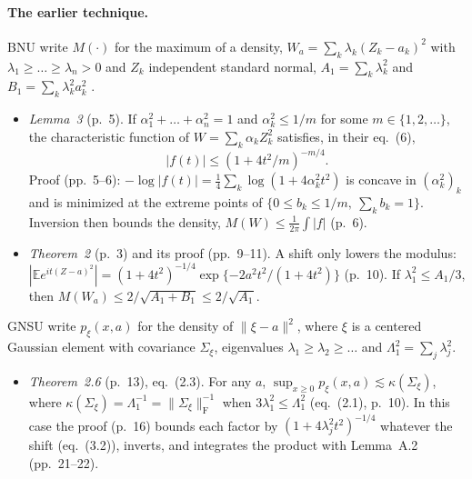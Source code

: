 \documentclass[11pt]{article}
\newcommand{\E}{\mathbb{E}}
\newcommand{\norm}[1]{\lVert #1\rVert}
\newcommand{\sloc}[2]{\cite[#2]{#1}}
\begin{document}
\paragraph{The earlier technique.}
BNU write $M(\cdot)$ for the maximum of a density, $W_a=\sum_k\lambda_k(Z_k-a_k)^2$
with $\lambda_1\ge\dots\ge\lambda_n>0$ and $Z_k$ independent standard normal,
$A_1=\sum_k\lambda_k^2$ and $B_1=\sum_k\lambda_k^2a_k^2$
\sloc{BobkovNaumovUlyanov2020-DensityMaxWeightedChiSquare}{\S2, p.~3}.
\begin{itemize}
\item \emph{Lemma~3} (p.~5). If $\alpha_1^2+\dots+\alpha_n^2=1$ and
 $\alpha_k^2\le1/m$ for some $m\in\{1,2,\dots\}$, the characteristic function
 of $W=\sum_k\alpha_kZ_k^2$ satisfies, in their eq.~(6),
 \[
  |f(t)|\le(1+4t^2/m)^{-m/4}.
 \]
 Proof (pp.~5--6): $-\log|f(t)|=\frac14\sum_k\log(1+4\alpha_k^2t^2)$ is concave in
 $(\alpha_k^2)_k$ and is minimized at the extreme points of
 $\{0\le b_k\le1/m,\ \sum_kb_k=1\}$. Inversion then bounds the density,
 $M(W)\le\frac1{2\pi}\int|f|$ (p.~6).
\item \emph{Theorem~2} (p.~3) and its proof (pp.~9--11). A shift only lowers
 the modulus: $|\E e^{it(Z-a)^2}|=(1+4t^2)^{-1/4}\exp\{-2a^2t^2/(1+4t^2)\}$
 (p.~10). If $\lambda_1^2\le A_1/3$, then
 $M(W_a)\le2/\sqrt{A_1+B_1}\le2/\sqrt{A_1}$.
\end{itemize}
GNSU write $p_\xi(x,a)$ for the density of $\norm{\xi-a}^2$, where $\xi$ is a
centered Gaussian element with covariance $\Sigma_\xi$, eigenvalues
$\lambda_1\ge\lambda_2\ge\dots$ and $\Lambda_1^2=\sum_j\lambda_j^2$.
\begin{itemize}
\item \emph{Theorem~2.6} (p.~13), eq.~(2.3). For any $a$,
 $\sup_{x\ge0}p_\xi(x,a)\lesssim\kappa(\Sigma_\xi)$, where
 $\kappa(\Sigma_\xi)=\Lambda_1^{-1}=\norm{\Sigma_\xi}_{\mathrm F}^{-1}$ when
 $3\lambda_1^2\le\Lambda_1^2$ (eq.~(2.1), p.~10). In this case the proof
 (p.~16) bounds each factor by $(1+4\lambda_j^2t^2)^{-1/4}$ whatever the shift
 (eq.~(3.2)), inverts, and integrates the product with Lemma~A.2
 (pp.~21--22).
\end{itemize}
\end{document}
